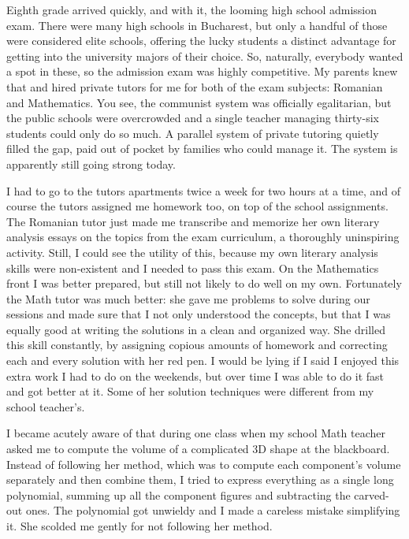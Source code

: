 \documentclass[12pt]{book}
\begin{document}
Eighth grade arrived quickly, and with it, the looming high school
admission exam. There were many high schools in Bucharest, but only a
handful of those were considered elite schools, offering the lucky
students a distinct advantage for getting into the university majors of
their choice. So, naturally, everybody wanted a spot in these, so the
admission exam was highly competitive. My parents knew that and hired
private tutors for me for both of the exam subjects: Romanian and
Mathematics. You see, the communist system was officially egalitarian,
but the public schools were overcrowded and a single teacher managing
thirty-six students could only do so much. A parallel system of private
tutoring quietly filled the gap, paid out of pocket by families who
could manage it. The system is apparently still going strong today.

I had to go to the tutors apartments twice a week for two hours at a
time, and of course the tutors assigned me homework too, on top of the
school assignments. The Romanian tutor just made me transcribe and
memorize her own literary analysis essays on the topics from the exam
curriculum, a thoroughly uninspiring activity. Still, I could see the
utility of this, because my own literary analysis skills were
non-existent and I needed to pass this exam. On the Mathematics front I
was better prepared, but still not likely to do well on my own.
Fortunately the Math tutor was much better: she gave me problems to
solve during our sessions and made sure that I not only understood the
concepts, but that I was equally good at writing the solutions in a
clean and organized way. She drilled this skill constantly, by assigning
copious amounts of homework and correcting each and every solution with
her red pen. I would be lying if I said I enjoyed this extra work I had
to do on the weekends, but over time I was able to do it fast and got
better at it. Some of her solution techniques were different from my
school teacher's.

I became acutely aware of that during one class when my school Math
teacher asked me to compute the volume of a complicated 3D shape at the
blackboard. Instead of following her method, which was to compute each
component's volume separately and then combine them, I tried to express
everything as a single long polynomial, summing up all the component
figures and subtracting the carved-out ones. The polynomial got unwieldy
and I made a careless mistake simplifying it. She scolded me gently for
not following her method.
\end{document}
